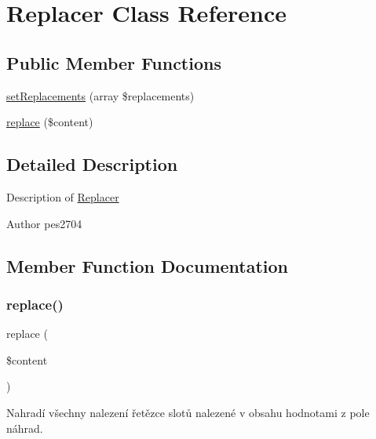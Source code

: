 \hypertarget{class_pes_1_1_slot_1_1_replacer}{}\section{Replacer Class Reference}
\label{class_pes_1_1_slot_1_1_replacer}
\subsection*{Public Member Functions}
\begin{DoxyCompactItemize}
\item 
\mbox{\hyperlink{class_pes_1_1_slot_1_1_replacer_a1105298416788f74d0c696669ccf8d17}{set\+Replacements}} (array \$replacements)
\item 
\mbox{\hyperlink{class_pes_1_1_slot_1_1_replacer_a019bce9449986aa11411064c8f9e02c2}{replace}} (\$content)
\end{DoxyCompactItemize}


\subsection{Detailed Description}
Description of \mbox{\hyperlink{class_pes_1_1_slot_1_1_replacer}{Replacer}}

\begin{DoxyAuthor}{Author}
pes2704 
\end{DoxyAuthor}


\subsection{Member Function Documentation}
\mbox{\label{class_pes_1_1_slot_1_1_replacer_a019bce9449986aa11411064c8f9e02c2}} 
\subsubsection{\texorpdfstring{replace()}{replace()}}
{\footnotesize\ttfamily replace (\begin{DoxyParamCaption}\item[{}]{\$content }\end{DoxyParamCaption})}

Nahradí všechny nalezení řetězce slotů nalezené v obsahu hodnotami z pole náhrad.


